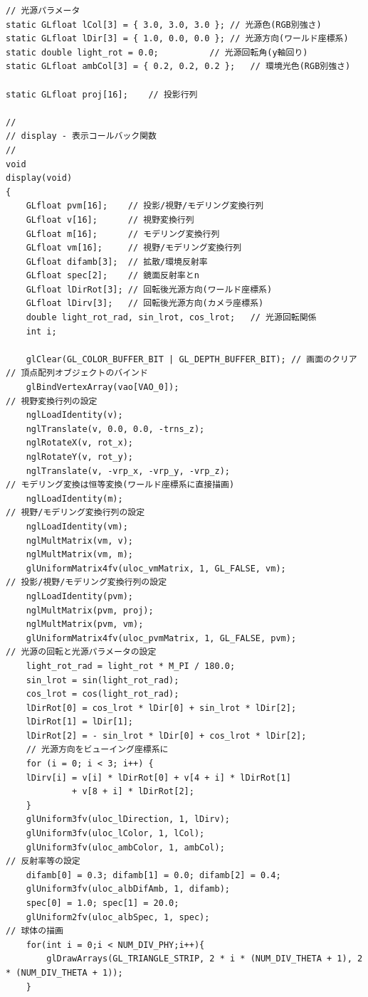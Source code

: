 \documentclass[12pt]{jreport}
\begin{document}
\begin{verbatim}
// 光源パラメータ
static GLfloat lCol[3] = { 3.0, 3.0, 3.0 };	// 光源色(RGB別強さ)
static GLfloat lDir[3] = { 1.0, 0.0, 0.0 };	// 光源方向(ワールド座標系)
static double light_rot = 0.0;			// 光源回転角(y軸回り)
static GLfloat ambCol[3] = { 0.2, 0.2, 0.2 };	// 環境光色(RGB別強さ)

static GLfloat proj[16];	// 投影行列

//
// display - 表示コールバック関数
//
void
display(void)
{
    GLfloat pvm[16];	// 投影/視野/モデリング変換行列
    GLfloat v[16];		// 視野変換行列
    GLfloat m[16];		// モデリング変換行列
    GLfloat vm[16];		// 視野/モデリング変換行列
    GLfloat difamb[3];	// 拡散/環境反射率
    GLfloat spec[2];	// 鏡面反射率とn
    GLfloat lDirRot[3];	// 回転後光源方向(ワールド座標系)
    GLfloat lDirv[3];	// 回転後光源方向(カメラ座標系)
    double light_rot_rad, sin_lrot, cos_lrot;	// 光源回転関係
    int i;

    glClear(GL_COLOR_BUFFER_BIT | GL_DEPTH_BUFFER_BIT); // 画面のクリア
// 頂点配列オブジェクトのバインド
    glBindVertexArray(vao[VAO_0]);
// 視野変換行列の設定
    nglLoadIdentity(v);
    nglTranslate(v, 0.0, 0.0, -trns_z);
    nglRotateX(v, rot_x);
    nglRotateY(v, rot_y);
    nglTranslate(v, -vrp_x, -vrp_y, -vrp_z);
// モデリング変換は恒等変換(ワールド座標系に直接描画)
    nglLoadIdentity(m);
// 視野/モデリング変換行列の設定
    nglLoadIdentity(vm);
    nglMultMatrix(vm, v);
    nglMultMatrix(vm, m);
    glUniformMatrix4fv(uloc_vmMatrix, 1, GL_FALSE, vm);
// 投影/視野/モデリング変換行列の設定
    nglLoadIdentity(pvm);
    nglMultMatrix(pvm, proj);
    nglMultMatrix(pvm, vm);
    glUniformMatrix4fv(uloc_pvmMatrix, 1, GL_FALSE, pvm);
// 光源の回転と光源パラメータの設定
    light_rot_rad = light_rot * M_PI / 180.0;
    sin_lrot = sin(light_rot_rad);
    cos_lrot = cos(light_rot_rad);
    lDirRot[0] = cos_lrot * lDir[0] + sin_lrot * lDir[2];
    lDirRot[1] = lDir[1];
    lDirRot[2] = - sin_lrot * lDir[0] + cos_lrot * lDir[2];
    // 光源方向をビューイング座標系に
    for (i = 0; i < 3; i++) {
	lDirv[i] = v[i] * lDirRot[0] + v[4 + i] * lDirRot[1]
	         + v[8 + i] * lDirRot[2];
    }
    glUniform3fv(uloc_lDirection, 1, lDirv);
    glUniform3fv(uloc_lColor, 1, lCol);
    glUniform3fv(uloc_ambColor, 1, ambCol);
// 反射率等の設定
    difamb[0] = 0.3; difamb[1] = 0.0; difamb[2] = 0.4;
    glUniform3fv(uloc_albDifAmb, 1, difamb);
    spec[0] = 1.0; spec[1] = 20.0;
    glUniform2fv(uloc_albSpec, 1, spec);
// 球体の描画
    for(int i = 0;i < NUM_DIV_PHY;i++){
        glDrawArrays(GL_TRIANGLE_STRIP, 2 * i * (NUM_DIV_THETA + 1), 2 * (NUM_DIV_THETA + 1));
    }


\end{verbatim}
\end{document}
